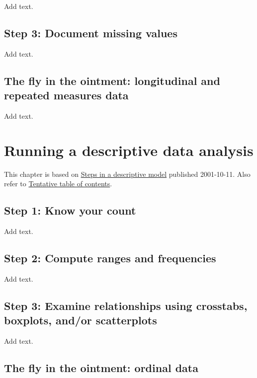 \documentclass[
  letterpaper,
  DIV=11,
  numbers=noendperiod]{scrreprt}
\begin{document}
Add text.

\section{Step 3: Document missing
values}\label{step-3-document-missing-values}

Add text.

\section{The fly in the ointment: longitudinal and repeated measures
data}\label{the-fly-in-the-ointment-longitudinal-and-repeated-measures-data}

Add text.


\chapter{Running a descriptive data
analysis}\label{running-a-descriptive-data-analysis}

This chapter is based on
\href{http://new.pmean.com/steps-in-descriptive-model/}{Steps in a
descriptive model} published 2001-10-11. Also refer to
\href{http://www.pmean.com/10/Contents.html}{Tentative table of
contents}.

\section{Step 1: Know your count}\label{step-1-know-your-count}

Add text.

\section{Step 2: Compute ranges and
frequencies}\label{step-2-compute-ranges-and-frequencies}

Add text.

\section{Step 3: Examine relationships using crosstabs, boxplots, and/or
scatterplots}\label{step-3-examine-relationships-using-crosstabs-boxplots-andor-scatterplots}

Add text.

\section{The fly in the ointment: ordinal
data}\label{the-fly-in-the-ointment-ordinal-data}
\end{document}
